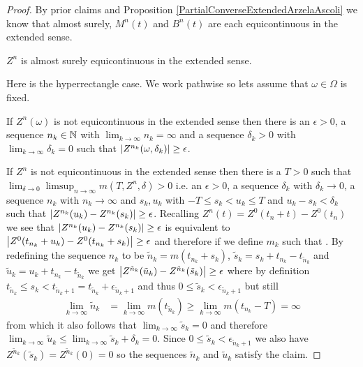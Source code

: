 \begin{proof}
By prior claims and Proposition \ref{PartialConverseExtendedArzelaAscoli} we know that almost surely, $M^n(t)$ and $B^n(t)$ are each equicontinuous in the extended sense. 

\begin{clm}$Z^n$ is almost surely equicontinuous in the extended sense.
\end{clm}
Here is the hyperrectangle case.  We work pathwise so lets assume that $\omega \in \Omega$ is fixed.  

\begin{clm}If $Z^n(\omega)$ is not equicontinuous in the extended sense then there is an $\epsilon > 0$, a sequence $n_k \in \mathbb{N}$ with $\lim_{k \to \infty} n_k = \infty$ and a sequence $\delta_k > 0$ with $\lim_{k \to \infty} \delta_k = 0$ such that $\left \vert Z^{n_k}(\omega, \delta_k) \right \vert \geq \epsilon$.
\end{clm}
 If $Z^n$ is not equicontinuous in the extended sense then there is a $T > 0$ such that $\lim_{\delta \to 0} \limsup_{n \to \infty} m(T, Z^n, \delta) > 0$ i.e. an $\epsilon > 0$, a sequence $\delta_k$ with $\delta_k \to 0$, a sequence $n_k$ with $n_k \to \infty$ and $s_k, u_k$ with $-T \leq s_k < u_k \leq T$ and $u_k - s_k < \delta_k$ such that $\left \vert Z^{n_k}(u_k) - Z^{n_k}(s_k) \right \vert \geq \epsilon$.  Recalling $Z^n(t) = Z^0(t_n+t) - Z^0(t_n)$  we see that $\left \vert Z^{n_k}(u_k) - Z^{n_k}(s_k) \right \vert \geq \epsilon$ is equivalent to $\left \vert Z^{0}(t_{n_k} + u_k) - Z^0(t_{n_k} + s_k) \right \vert \geq \epsilon$ and therefore if we define $m_k$ such that .  By redefining the sequence $n_k$ to be $\tilde{n}_k = m(t_{n_k} + s_k)$, $\tilde{s}_k = s_k  + t_{n_k} - t_{\tilde{n}_k}$  and $\tilde{u}_k = u_k + t_{n_k} - t_{\tilde{n}_k}$ we get $\left \vert Z^{\tilde{n}_k}(\tilde{u}_k) - Z^{\tilde{n}_k}(\tilde{s}_k) \right \vert \geq \epsilon$ where by definition $t_{\tilde{n}_k} \leq s_k < t_{\tilde{n}_k + 1} = t_{\tilde{n}_k } + \epsilon_{\tilde{n}_k+1}$ and thus $0 \leq \tilde{s}_k < \epsilon_{\tilde{n}_k+1}$   but still 
\begin{align*}
\lim_{k \to \infty} \tilde{n}_k &= \lim_{k \to \infty} m(t_{\tilde{n}_k}) \geq \lim_{k \to \infty} m(t_{n_k} - T) = \infty
\end{align*} 
from which it also follows that $\lim_{k \to \infty} \tilde{s}_k = 0$ and therefore $\lim_{k \to \infty} \tilde{u}_k \leq  \lim_{k \to \infty} \tilde{s}_k + \delta_k = 0$.  Since $0 \leq \tilde{s}_k < \epsilon_{\tilde{n}_k+1}$ we also have $Z^{\tilde{n}_k}(\tilde{s}_k) = Z^{\tilde{n}_k}(0) = 0$ so the sequences $\tilde{n}_k$ and $\tilde{u}_k$ satisfy the claim.


\end{proof}
